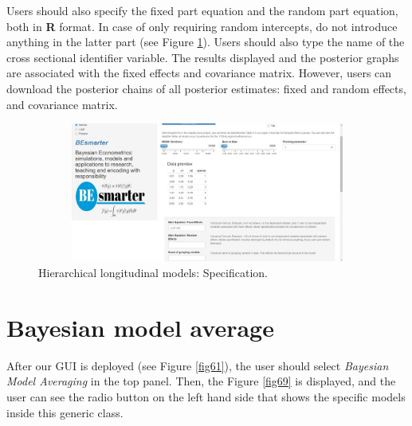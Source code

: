 Users should also specify the fixed part equation and the random part equation,
both in \textbf{R} format. In case of only requiring random intercepts, do not introduce anything in the latter part (see Figure \ref{fig68}). Users should also type the name of the cross sectional identifier variable. The results displayed and the posterior graphs are associated with the fixed effects and covariance matrix. However, users can download the posterior chains of all posterior estimates: fixed and random effects, and covariance matrix.

\begin{figure}
	\includegraphics[width=340pt, height=130pt]{Chapters/chapterGUI/figures/Figure8.jpg}
	\caption[List of figure caption goes here]{Hierarchical longitudinal models: Specification.}\label{fig68}
\end{figure} 

\section{Bayesian model average}\label{secGUI6}

After our GUI is deployed (see Figure \ref{fig61}), the user should select \textit{Bayesian Model Averaging} in the top panel. Then, the Figure \ref{fig69} is displayed, and the user can see the radio button on the left hand side that shows the specific models inside this generic class.

